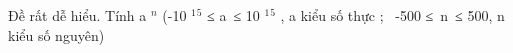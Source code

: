 Đề rất dễ hiểu. Tính a $^ n $ (-10 $^ 1 $$^ 5 $ ≤ a ≤ 10 $^ 1 $$^ 5 $ , a kiểu số thực ;  -500 ≤ n ≤ 500, n kiểu số nguyên)

\